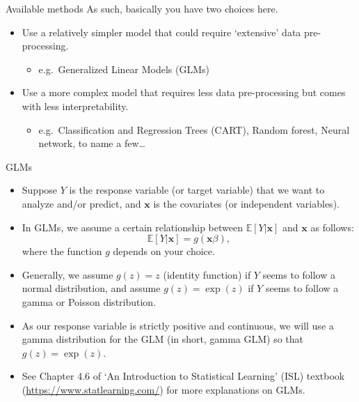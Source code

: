 \begin{frame}{Available methods}
As such, basically you have two choices here.
\begin{itemize}
  \item Use a relatively simpler model that could require ‘extensive’ data pre-processing.
  \begin{itemize}
    \item e.g.\ Generalized Linear Models (GLMs)
  \end{itemize}
  \item Use a more complex model that requires less data pre-processing but comes with less interpretability.
  \begin{itemize}
    \item e.g.\ Classification and Regression Trees (CART), Random forest, Neural network, to name a few\ldots
  \end{itemize}
\end{itemize}
\end{frame}

\begin{frame}{GLMs}
\begin{itemize}
  \item Suppose \(Y\) is the response variable (or target variable) that we want to analyze and/or predict, and \(\mathbf{x}\) is the covariates (or independent variables).
  \item In GLMs, we assume a certain relationship between \(\mathbb{E}[Y|\mathbf{x}]\) and \(\mathbf{x}\) as follows:
  \[
    \mathbb{E}[Y|\mathbf{x}] = g (\mathbf{x}\beta),
  \]
  where the function \(g\) depends on your choice.
  \item Generally, we assume \(g(z)=z\) (identity function) if \(Y\) seems to follow a normal distribution, and assume \(g(z)=\exp (z)\) if \(Y\) seems to follow a gamma or Poisson distribution.
  \item As our response variable  is strictly positive and continuous, we will use a gamma distribution for the GLM (in short, gamma GLM) so that \(g(z) = \exp(z)\).
  \item See Chapter 4.6 of ‘An Introduction to Statistical Learning’ (ISL) textbook (\url{https://www.statlearning.com/}) for more explanations on GLMs.
\end{itemize}
\end{frame}

